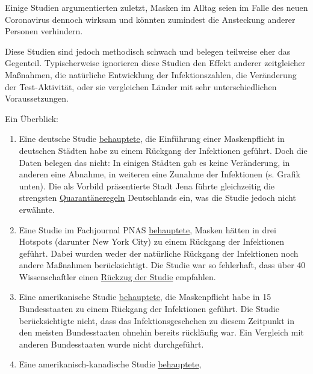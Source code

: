 Einige Studien argumentierten zuletzt, Masken im Alltag seien im Falle
des neuen Coronavirus dennoch wirksam und könnten zumindest die
Ansteckung anderer Personen verhindern.

Diese Studien sind jedoch methodisch schwach und belegen teilweise eher
das Gegenteil. Typischerweise ignorieren diese Studien den Effekt
anderer zeitgleicher Maßnahmen, die natürliche Entwicklung der
Infektionszahlen, die Veränderung der Test-Aktivität, oder sie
vergleichen Länder mit sehr unterschiedlichen Voraussetzungen.

Ein Überblick:

\begin{enumerate}
\def\labelenumi{\arabic{enumi}.}
\tightlist
\item
  Eine deutsche Studie
  \href{http://ftp.iza.org/dp13319.pdf\#page=28}{behauptete}, die
  Einführung einer Maskenpflicht in deutschen Städten habe zu einem
  Rückgang der Infektionen geführt. Doch die Daten belegen das nicht: In
  einigen Städten gab es keine Veränderung, in anderen eine Abnahme, in
  weiteren eine Zunahme der Infektionen (s. Grafik unten). Die als
  Vorbild präsentierte Stadt Jena führte gleichzeitig die strengsten
  \href{https://www.mdr.de/thueringen/ost-thueringen/jena/corona-jena-seit-einer-woche-keine-neuinfektion-100.html}{Quarantäneregeln}
  Deutschlands ein, was die Studie jedoch nicht erwähnte.
\item
  Eine Studie im Fachjournal PNAS
  \href{https://www.pnas.org/content/117/26/14857}{behauptete}, Masken
  hätten in drei Hotspots (darunter New York City) zu einem Rückgang der
  Infektionen geführt. Dabei wurden weder der natürliche Rückgang der
  Infektionen noch andere Maßnahmen berücksichtigt. Die Studie war so
  fehlerhaft, dass über 40 Wissenschaftler einen
  \href{https://reason.com/2020/06/22/prominent-researchers-say-a-widely-cited-study-on-wearing-masks-is-badly-flawed/}{Rückzug
  der Studie} empfahlen.
\item
  Eine amerikanische Studie
  \href{https://www.healthaffairs.org/doi/full/10.1377/hlthaff.2020.00818}{behauptete},
  die Maskenpflicht habe in 15 Bundesstaaten zu einem Rückgang der
  Infektionen geführt. Die Studie berücksichtigte nicht, dass das
  Infektionsgeschehen zu diesem Zeitpunkt in den meisten Bundesstaaten
  ohnehin bereits rückläufig war. Ein Vergleich mit anderen
  Bundesstaaten wurde nicht durchgeführt.
\item
  Eine amerikanisch-kanadische Studie
  \href{https://www.medrxiv.org/content/10.1101/2020.05.22.20109231v3.full.pdf}{behauptete},

\end{enumerate}
